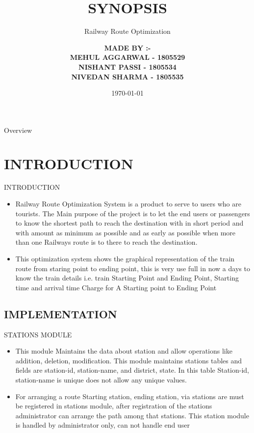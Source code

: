 \documentclass[aspectratio=169,xcolor=dvipsnames]{beamer}
\title{\textbf{SYNOPSIS}}
\subtitle{Railway Route Optimization }
\author[Railway Route Optimization  ]
{\large{\textbf{\textcolor[RGB]{255,0,0}{MADE BY :-}}}\\
{\small{\textbf{\textcolor[RGB]{20,13,125}{	MEHUL AGGARWAL  \hspace{0.1cm} -  1805529}}}}\\
{\small{\textbf {\textcolor[RGB]{20,13,125}{ NISHANT PASSI\hspace{0.8cm} - 1805534}}}}\\
{\small{\textbf {\textcolor[RGB]{20,13,125}{ NIVEDAN SHARMA \hspace{0.1cm} - 1805535}}}} \\}
\institute[GNDEC]
{\small{{\textcolor[RGB]{20,13,125}{Department of Information Technology\\
  Guru Nanak Dev Engineering College, Ludhiana}}\\
 }}
\date{\today} %
\begin{document}
\begin{frame}
 \titlepage
\end{frame}

\begin{frame}{Overview}
\tableofcontents
\end{frame}

\section{\textcolor[RGB]{255,0,0}{INTRODUCTION}}

\begin{frame}{INTRODUCTION}
\begin{itemize}

   \item Railway Route Optimization System is a product to serve to users who are tourists. The Main purpose of the project is to let the end users or passengers to know the shortest path to reach the destination with in short period and with amount as minimum as possible and as early as possible when more than one Railways route is to there to reach the destination.
   \item This optimization system shows the graphical representation of the train route from staring point to ending point, this is very use full in now a days to know the train details i.e. train Starting Point and Ending Point, Starting time and arrival time Charge for A Starting point to Ending Point
  
\end{itemize}
\end{frame}


\subsection{\textcolor[RGB]{0,0,0}{IMPLEMENTATION}}
\begin{frame}{STATIONS MODULE}
\begin{itemize}

   \item This module Maintains the data about station and allow operations like addition, deletion, modification. This module maintains stations tables and fields are station-id, station-name, and district, state. In this table Station-id, station-name is unique does not allow any unique values.
   \item For arranging a route Starting station, ending station, via stations are must be registered in stations module, after registration of the stations administrator can arrange the path among that stations. This station module is handled by administrator only, can not handle end user

\end{itemize}
\end{frame}
\end{document}
